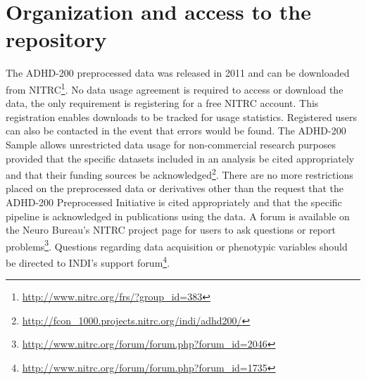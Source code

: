 \documentclass[preprint,12pt,3p]{elsarticle}
\begin{document}


\section{Organization and access to the repository}

The ADHD-200 preprocessed data was released in 2011 and can be downloaded from NITRC\footnote{\url{http://www.nitrc.org/frs/?group_id=383}}. No data usage agreement is required to access or download the data, the only requirement is registering for a free NITRC account. This registration enables downloads to be tracked for usage statistics. Registered users can also be contacted in the event that errors would be found. The ADHD-200 Sample allows unrestricted data usage for non-commercial research purposes provided that the specific datasets included in an analysis be cited appropriately and that their funding sources be acknowledged\footnote{\url{http://fcon_1000.projects.nitrc.org/indi/adhd200/}}. There are no more restrictions placed on the preprocessed data or derivatives other than the request that the ADHD-200 Preprocessed Initiative is cited appropriately and that the specific pipeline is acknowledged in publications using the data. A forum is available on the Neuro Bureau's NITRC project page for users to ask questions or report
problems\footnote{\url{http://www.nitrc.org/forum/forum.php?forum_id=2046}}. Questions regarding data acquisition or phenotypic variables should be directed to INDI's support forum\footnote{\url{http://www.nitrc.org/forum/forum.php?forum_id=1735}}. 
\end{document}
